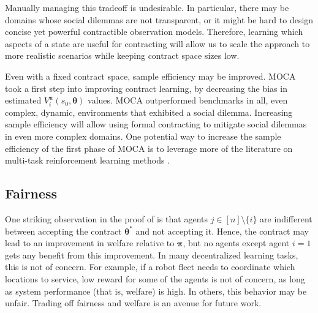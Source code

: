 \documentclass[referee,sn-basic]{sn-jnl}
\newcommand{\bpi}{\boldsymbol{\pi}}
\theoremstyle{thmstyleone}%
\theoremstyle{thmstyletwo}%
\theoremstyle{thmstylethree}%
\begin{document}
Manually managing this tradeoff is undesirable. In particular, there may be domains whose social dilemmas are not transparent, or it might be hard to design concise yet powerful contractible observation models. Therefore, learning which aspects of a state are useful for contracting will allow us to scale the approach to more realistic scenarios while keeping contract space sizes low.
     
Even with a fixed contract space, sample efficiency may be improved. MOCA took a first step into improving contract learning, by decreasing the bias in estimated $V_i^{\boldsymbol\pi} (s_0, \boldsymbol\theta)$ values. MOCA outperformed benchmarks in all, even complex, dynamic, environments that exhibited a social dilemma. Increasing sample efficiency will allow using formal contracting to mitigate social dilemmas in even more complex domains. One potential way to increase the sample efficiency of the first phase of MOCA is to leverage more of the literature on multi-task reinforcement learning methods \cite{devin2017learning, rusu_policy_2015, parisotto_actor-mimic_2015, teh2017distral}.

\subsection{Fairness}\label{subsec:fairness}
One striking observation in the proof of  is that agents $j \in [n] \setminus \{i\}$ are indifferent between accepting the contract $\boldsymbol\theta^*$ and not accepting it. Hence, the contract may lead to an improvement in welfare relative to $\bpi$, but no agents except agent $i=1$ gets any benefit from this improvement. In many decentralized learning tasks, this is not of concern. For example, if a robot fleet needs to coordinate which locations to service, low reward for some of the agents is not of concern, as long as system performance (that is, welfare) is high. In others, this behavior may be unfair. Trading off fairness and welfare is an avenue for future work.

\appendix


\end{document}
